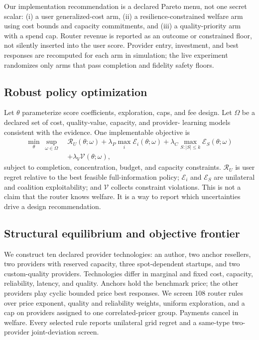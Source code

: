 \documentclass[sigconf,nonacm]{acmart}
\newcommand{\1}{\mathbf 1}
\begin{document}
Our implementation recommendation is a declared Pareto menu, not one secret
scalar: (i) a user generalized-cost arm, (ii) a resilience-constrained welfare
arm using cost bounds and capacity commitments, and (iii) a quality-priority arm
with a spend cap.  Router revenue is reported as an outcome or constrained
floor, not silently inserted into the user score.  Provider entry, investment,
and best responses are recomputed for each arm in simulation; the live
experiment randomizes only arms that pass completion and fidelity safety floors.

\subsection{Robust policy optimization}

Let $\theta$ parameterize score coefficients, exploration, caps, and fee design.
Let $\Omega$ be a declared set of cost, quality-value, capacity, and provider-
learning models consistent with the evidence.  One implementable objective is
\begin{align}
\min_{\theta}\ \sup_{\omega\in\Omega}\;&
\mathcal R_U(\theta;\omega)
+\lambda_P\max_i\mathcal E_i(\theta;\omega)
+\lambda_C\max_{S:|S|\le k}\mathcal E_S(\theta;\omega) \nonumber\\
&+\lambda_V\mathcal V(\theta;\omega),
\label{eq:robustdesign}
\end{align}
subject to completion, concentration, budget, and capacity constraints.
$\mathcal R_U$ is user regret relative to the best feasible full-information
policy; $\mathcal E_i$ and $\mathcal E_S$ are unilateral and coalition
exploitability; and $\mathcal V$ collects constraint violations.  This is not a
claim that the router knows welfare.  It is a way to report which uncertainties
drive a design recommendation.

\subsection{Structural equilibrium and objective frontier}

We construct ten declared provider technologies: an author, two anchor
resellers, two providers with reserved capacity, three spot-dependent startups,
and two custom-quality providers.  Technologies differ in marginal and fixed
cost, capacity, reliability, latency, and quality.  Anchors hold the benchmark
price; the other providers play cyclic bounded price best responses.  We screen
108 router rules over price exponent, quality and reliability weights, uniform
exploration, and a cap on providers assigned to one correlated-pricer group.
Payments cancel in welfare.  Every selected rule reports unilateral grid regret
and a same-type two-provider joint-deviation screen.
\end{document}
